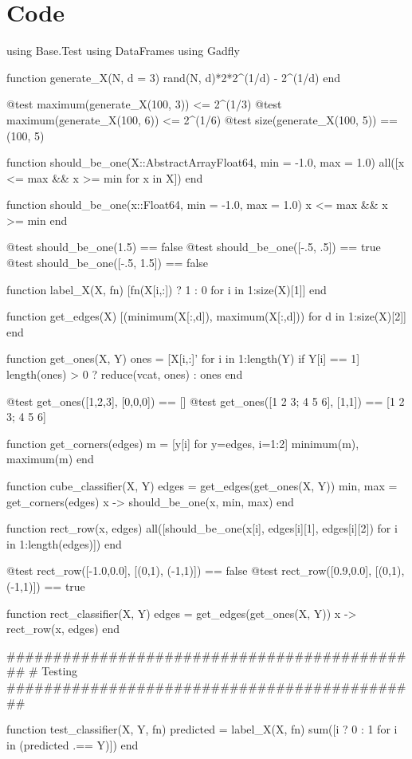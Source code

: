 \documentclass[a4paper,12pt]{article}
\begin{document}
\section*{Code}
\begin{juliacode}
using Base.Test
using DataFrames
using Gadfly

function generate_X(N, d = 3)
    rand(N, d)*2*2^(1/d) - 2^(1/d)
end

@test maximum(generate_X(100, 3)) <= 2^(1/3)
@test maximum(generate_X(100, 6)) <= 2^(1/6)
@test size(generate_X(100, 5)) == (100, 5)

function should_be_one(X::AbstractArray{Float64}, min = -1.0, max = 1.0)
    all([x <= max && x >= min for x in X])
end

function should_be_one(x::Float64, min = -1.0, max = 1.0)
    x <= max && x >= min
end

@test should_be_one(1.5) == false
@test should_be_one([-.5, .5]) == true
@test should_be_one([-.5, 1.5]) == false

function label_X(X, fn)
    [fn(X[i,:]) ? 1 : 0 for i in 1:size(X)[1]]
end

function get_edges(X)
    [(minimum(X[:,d]), maximum(X[:,d])) for d in 1:size(X)[2]]
end

function get_ones(X, Y)
    ones = [X[i,:]' for i in 1:length(Y) if Y[i] == 1]
    length(ones) > 0 ? reduce(vcat, ones) : ones
end

@test get_ones([1,2,3], [0,0,0]) == []
@test get_ones([1 2 3; 4 5 6], [1,1]) == [1 2 3; 4 5 6]

function get_corners(edges)
    m = [y[i] for y=edges, i=1:2]
    minimum(m), maximum(m)
end

function cube_classifier(X, Y)
    edges = get_edges(get_ones(X, Y))
    min, max = get_corners(edges)
    x -> should_be_one(x, min, max)
end

function rect_row(x, edges)
    all([should_be_one(x[i], edges[i][1], edges[i][2]) for i in 1:length(edges)])
end

@test rect_row([-1.0,0.0], [(0,1), (-1,1)]) == false
@test rect_row([0.9,0.0], [(0,1), (-1,1)]) == true

function rect_classifier(X, Y)
    edges = get_edges(get_ones(X, Y))
    x -> rect_row(x, edges)
end

#############################################
# Testing
#############################################

function test_classifier(X, Y, fn)
    predicted = label_X(X, fn)
    sum([i ? 0 : 1 for i in (predicted .== Y)])
end


\end{juliacode}
\end{document}

